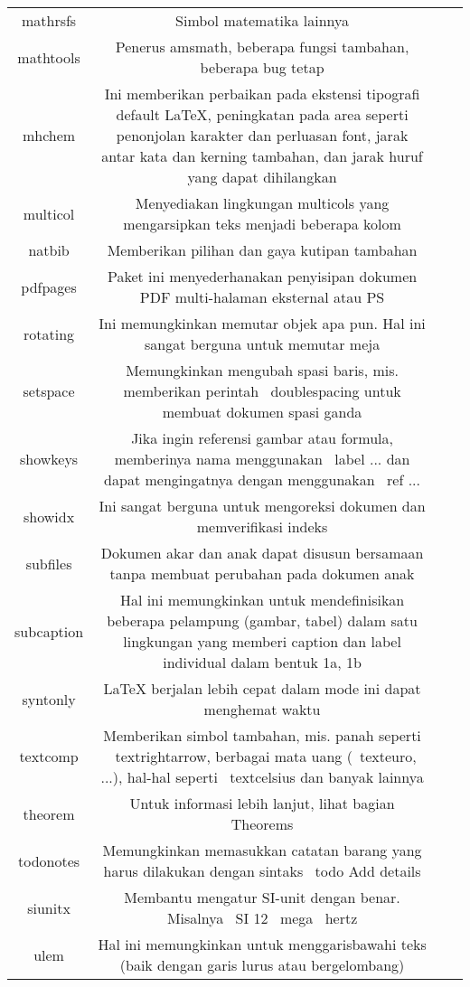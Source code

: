 \begin{table}[ht]
\begin{tabular}{cccc}
		mathrsfs&Simbol matematika lainnya&\\
		mathtools&Penerus amsmath, beberapa fungsi tambahan, beberapa bug tetap&\\
		mhchem&Ini memberikan perbaikan pada ekstensi tipografi default LaTeX, peningkatan pada area seperti penonjolan karakter dan perluasan font, jarak antar kata dan kerning tambahan, dan jarak huruf yang dapat dihilangkan&\\
		multicol&Menyediakan lingkungan multicols yang mengarsipkan teks menjadi beberapa kolom&\\
		natbib&Memberikan pilihan dan gaya kutipan tambahan&\\
		pdfpages&Paket ini menyederhanakan penyisipan dokumen PDF multi-halaman eksternal atau PS&\\
		rotating&Ini memungkinkan memutar objek apa pun. Hal ini sangat berguna untuk memutar meja&\\
		setspace&Memungkinkan mengubah spasi baris, mis. memberikan perintah \ doublespacing untuk membuat dokumen spasi ganda&\\
		showkeys&Jika ingin referensi gambar atau formula,  memberinya nama menggunakan \ label {...} dan dapat mengingatnya dengan menggunakan \ ref {...}&\\
		showidx&Ini sangat berguna untuk mengoreksi dokumen dan memverifikasi indeks&\\
		subfiles&Dokumen akar dan anak dapat disusun bersamaan tanpa membuat perubahan pada dokumen anak&\\
		subcaption&Hal ini memungkinkan untuk mendefinisikan beberapa pelampung (gambar, tabel) dalam satu lingkungan yang memberi caption dan label individual dalam bentuk 1a, 1b&\\
		syntonly&LaTeX berjalan lebih cepat dalam mode ini dapat menghemat waktu&\\
		textcomp&Memberikan simbol tambahan, mis. panah seperti \ textrightarrow, berbagai mata uang (\ texteuro, ...), hal-hal seperti \ textcelsius dan banyak lainnya&\\
		theorem& Untuk informasi lebih lanjut, lihat bagian Theorems&\\
		todonotes&Memungkinkan memasukkan catatan barang yang harus dilakukan dengan sintaks \ todo {Add details}&\\
		siunitx&Membantu mengatur SI-unit dengan benar. Misalnya \ SI {12} {\ mega \ hertz}&\\
		ulem&Hal ini memungkinkan untuk menggarisbawahi teks (baik dengan garis lurus atau bergelombang)&\\

\end{tabular}
\end{table}
